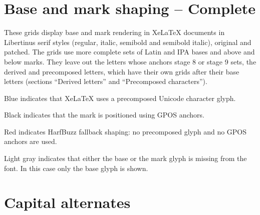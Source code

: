\documentclass[landscape]{article}
\newcommand{\SUPPORTEDANCH}[1]{{\color{supportedanchor}#1}}
\newcommand{\SUPPORTEDPREC}[1]{{\color{supportedprec}#1}}
\newcommand{\SUPPORTEDFALL}[1]{{\color{supportedfall}#1}}
\newcommand{\MISSINGGLYPH}[1]{{\color{missingglyph}#1}}
\begin{document}




\newpage
\section*{Base and mark shaping  -- Complete}

These grids display base and mark rendering in XeLaTeX documents in 
Libertinus serif styles (regular, italic, semibold and semibold italic), original and patched.
The grids use more complete sets of Latin and IPA bases and above and below marks.
They leave out the letters whose anchors stage 8 or stage 9 sets, the derived and precomposed letters, which have their own grids after their base letters
(sections ``Derived letters'' and ``Precomposed characters'').

\SUPPORTEDPREC{Blue} indicates that XeLaTeX uses a precomposed
Unicode character glyph.

\SUPPORTEDANCH{Black} indicates that the mark is positioned
using GPOS anchors.

\SUPPORTEDFALL{Red} indicates HarfBuzz fallback shaping: no precomposed
glyph and no GPOS anchors are used.

\MISSINGGLYPH{Light gray} indicates that either the base or the
mark glyph is missing from the font. 
In this case only the base glyph is shown.



\newpage
\section*{Capital alternates}
\end{document}
